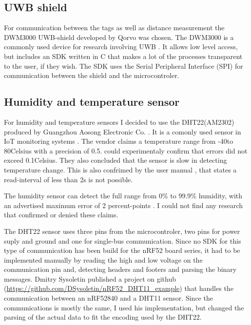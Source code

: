 \subsection{UWB shield}
For communication between the tags as well as distance measurement the DWM3000 UWB-shield developed by Qorvo was chosen.
The DWM3000 is a commonly used device for research involving UWB \cite{coppens2022overview, leu2022ghost, stocker2022performance}.
It allows low level access, but includes an SDK written in C that makes a lot of the processes transparent to the user, if they wish.
The SDK uses the Serial Peripheral Interface (SPI) for communication between the shield and the microcontroler.



\subsection{Humidity and temperature sensor}

For humidity and temperature sensors I decided to use the DHT22(AM2302) produced by Guangzhou Aosong Electronic Co. \cite{AM2302}. 
It is a comonly used sensor in IoT monitoring systems \cite{ahmad2021evaluation}. 
The vendor claims a temperature range from -40\degree to 80\degree Celsius with a precision of 0.5\degree. 
\cite{ahmad2021evaluation} could experimentaly confirm that errors did not exceed 0.1\degree Celsius. 
They also concluded that the sensor is slow in detecting temperature change. 
This is also confrimed by the user manual \cite{AM2302}, that states a read-interval of less than 2s is not possible. 

The humidity sensor can detect the full range from 0\% to 99.9\% humidity, with an advertised maximum error of 2 percent-points \cite{AM2302}.
I could not find any research that confirmed or denied these claims.

The DHT22 sensor uses three pins from the microcontroler, two pins for power suply and ground and one for single-bus communication.
Since no SDK for this type of communication has been build for the nRF52 board series, it had to be implemented manually by reading the high and low voltage on the communication pin and, detecting headers and footers and parsing the binary messages. 
Dmitry Sysoletin published a project on github (\url{https://github.com/DSysoletin/nRF52_DHT11_example}) that handles the communication between an nRF52840 and a DHT11 sensor. 
Since the communications is mostly the same, I used his implementation, but changed the parsing of the actual data to fit the encoding used by the DHT22.

